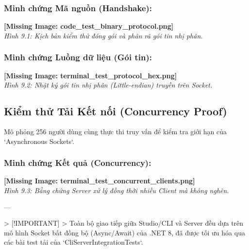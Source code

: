 \subsubsection{Minh chứng Mã nguồn (Handshake):}
\textbf{[Missing Image: code_test_binary_protocol.png]}\\ \textit{Hình 9.1: Kịch bản kiểm thử đóng gói và phân rã gói tin nhị phân.}

\subsubsection{Minh chứng Luồng dữ liệu (Gói tin):}
\textbf{[Missing Image: terminal_test_protocol_hex.png]}\\ \textit{Hình 9.2: Nhật ký gói tin nhị phân (Little-endian) truyền trên Socket.}

\subsection{Kiểm thử Tải Kết nối (Concurrency Proof)}

Mô phỏng 256 người dùng cùng thực thi truy vấn để kiểm tra giới hạn của `Asynchronous Sockets`.

\subsubsection{Minh chứng Kết quả (Concurrency):}
\textbf{[Missing Image: terminal_test_concurrent_clients.png]}\\ \textit{Hình 9.3: Bằng chứng Server xử lý đồng thời nhiều Client mà không nghẽn.}

---

> [!IMPORTANT]
> Toàn bộ giao tiếp giữa Studio/CLI và Server đều dựa trên mô hình Socket bất đồng bộ (Async/Await) của .NET 8, đã được tối ưu hóa qua các bài test tải của `CliServerIntegrationTests`.

